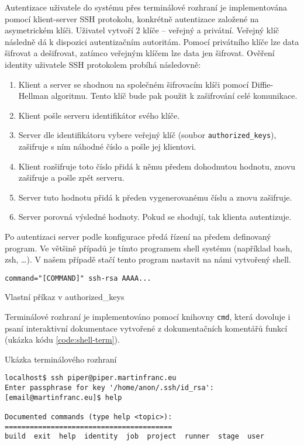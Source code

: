 Autentizace uživatele do systému přes terminálové rozhraní je implementována pomocí klient-server SSH protokolu, konkrétně autentizace založené na asymetrickém klíči.
Uživatel vytvoří 2 klíče -- veřejný a privátní.
Veřejný klíč následně dá k dispozici autentizačním autoritám.
Pomocí privátního klíče lze data šifrovat a dešifrovat, zatímco veřejným klíčem lze data jen šifrovat.
Ověření identity uživatele SSH protokolem probíhá následovně:

\begin{enumerate}
    \item Klient a server se shodnou na společném šifrovacím klíči pomocí Diffie-Hellman algoritmu.
    Tento klíč bude pak použit k zašifrování celé komunikace.
    \item Klient pošle serveru identifikátor svého klíče.
    \item Server dle identifikátoru vybere veřejný klíč (soubor \verb|authorized_keys|), zašifruje s ním náhodné číslo a pošle jej klientovi.
    \item Klient rozšifruje toto číslo přidá k němu předem dohodnutou hodnotu, znovu zašifruje a pošle zpět serveru.
    \item Server tuto hodnotu přidá k předen vygenerovanému číslu a znovu zašifruje.
    \item Server porovná výsledné hodnoty. Pokud se shodují, tak klienta autentizuje.
\end{enumerate}

Po autentizaci server podle konfigurace předá řízení na předem definovaný program.
Ve většině případů je tímto programem shell systému (například bash, zsh, \ldots).
V našem případě stačí tento program nastavit na námi vytvořený shell.

\begin{listing}[ht]
\begin{verbatim}
command="[COMMAND]" ssh-rsa AAAA...
\end{verbatim}
\caption{Vlastní příkaz v authorized\_keys}
\end{listing}

Terminálové rozhraní je implementováno pomocí knihovny \verb|cmd|, která dovoluje i psaní interaktivní dokumentace vytvořené z dokumentačních komentářů funkcí (ukázka kódu \ref{code:shell-term}).

\begin{listing}[ht]
\caption{\label{code:shell-term}Ukázka terminálového rozhraní}
\begin{verbatim}
localhost$ ssh piper@piper.martinfranc.eu
Enter passphrase for key '/home/anon/.ssh/id_rsa': 
[email@martinfranc.eu]$ help

Documented commands (type help <topic>):
========================================
build  exit  help  identity  job  project  runner  stage  user

\end{verbatim}
\end{listing}

